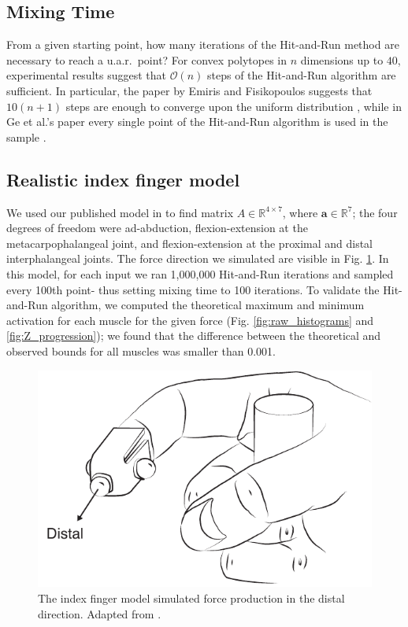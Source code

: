 \subsection*{Mixing Time}
\label{sec_lengthrun}
From a given starting point, how many iterations of the Hit-and-Run method are necessary to reach a u.a.r.\ point?
For convex polytopes in $n$ dimensions up to $40$, experimental results suggest that $\mathcal{O}(n)$ steps of the Hit-and-Run algorithm are sufficient.
In particular, the paper \cite{emiris2013efficient} by Emiris and Fisikopoulos suggests that $10(n + 1)$ steps are enough to converge upon the uniform distribution \cite{emiris2013efficient}, while in Ge et al.'s paper every single point of the Hit-and-Run algorithm is used in the sample \cite{Ge}. 

\subsection*{Realistic index finger model}
\label{ss:finger}
We used our published model in \cite{Valero-Cuevas1998Large} to find matrix $A \in \mathbb{R}^{4 \times 7}$, where $\textbf{a} \in \mathbb{R}^7$; the four degrees of freedom were ad-abduction, flexion-extension at the metacarpophalangeal joint, and flexion-extension at the proximal and distal interphalangeal joints.
The force direction we simulated are visible in Fig. \ref{fig:finger}.
In this model, for each input we ran 1,000,000 Hit-and-Run iterations and sampled every 100th point- thus setting mixing time to 100 iterations.
To validate the Hit-and-Run algorithm, we computed the theoretical maximum and minimum activation for each muscle for the given force (Fig. \ref{fig:raw_histograms} and \ref{fig:Z_progression}); we found that the difference between the theoretical and observed bounds for all muscles was smaller than 0.001.

\begin{figure}[ht]
  \centering
  \includegraphics[]{sections/figs/finger.pdf}
  \caption{The index finger model simulated force production in the distal direction. Adapted from \cite{Valero-Cuevas1998Large}.}
  \label{fig:finger}
\end{figure}

